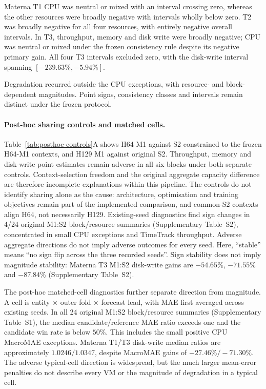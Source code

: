 \documentclass[a4paper,fleqn]{cas-dc}
\begin{document}
Materna T1 CPU was neutral or mixed with an interval crossing zero, whereas
the other resources were broadly negative with intervals wholly below zero.
T2 was broadly negative for all four resources, with entirely negative
overall intervals. In T3, throughput, memory and disk write were broadly
negative; CPU was neutral or mixed under the frozen consistency rule despite
its negative primary gain. All four T3 intervals excluded zero, with the
disk-write interval spanning $[-239.63\%,-5.94\%]$.

Degradation recurred outside the CPU exceptions, with resource- and
block-dependent magnitudes. Point signs, consistency classes and intervals
remain distinct under the frozen protocol.

\paragraph{Post-hoc sharing controls and matched cells.}
Table~\ref{tab:posthoc-controls}A shows H64 M1 against S2 constrained to the
frozen H64-M1 contexts, and H129 M1 against original S2. Throughput, memory
and disk-write point estimates remain adverse in all six blocks under both
separate controls. Context-selection freedom and the original aggregate
capacity difference are therefore incomplete explanations within this
pipeline. The controls do not identify sharing alone as the cause:
architecture, optimisation and training objectives remain part of the
implemented comparison, and common-S2 contexts align H64, not necessarily
H129. Existing-seed diagnostics find sign changes in 4/24 original M1:S2
block/resource summaries (Supplementary Table~S2), concentrated in small
CPU exceptions and TimeTrack throughput. Adverse aggregate directions do not
imply adverse outcomes for every seed. Here, ``stable'' means ``no sign flip
across the three recorded seeds''. Sign stability does not imply magnitude
stability: Materna T3 M1:S2 disk-write gains are $-54.65\%$, $-71.55\%$ and
$-87.84\%$ (Supplementary Table~S2).

The post-hoc matched-cell diagnostics further separate direction from
magnitude. A cell is entity $\times$ outer fold $\times$ forecast lead, with
MAE first averaged across existing seeds. In all 24 original M1:S2
block/resource summaries (Supplementary Table~S1), the median candidate/reference MAE ratio exceeds
one and the candidate win rate is below $50\%$. This includes the small
positive CPU MacroMAE exceptions. Materna T1/T3 disk-write median ratios are
approximately $1.0246/1.0347$, despite MacroMAE gains of
$-27.46\%/-71.30\%$. The adverse typical-cell direction is widespread, but
the much larger mean-error penalties do not describe every VM or the
magnitude of degradation in a typical cell.
\end{document}
